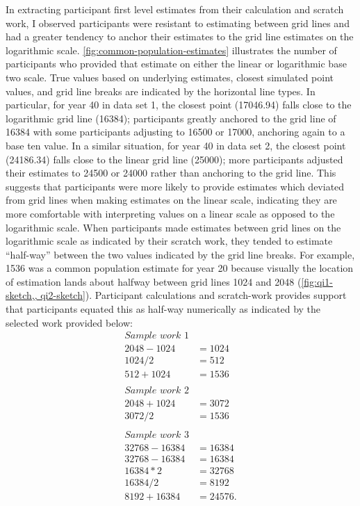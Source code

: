 \documentclass[print]{nuthesis}
\begin{document}
In extracting participant first level estimates from their calculation and scratch work, I observed participants were resistant to estimating between grid lines and had a greater tendency to anchor their estimates to the grid line estimates on the logarithmic scale.
\cref{fig:common-population-estimates} illustrates the number of participants who provided that estimate on either the linear or logarithmic base two scale.
True values based on underlying estimates, closest simulated point values, and grid line breaks are indicated by the horizontal line types.
In particular, for year 40 in data set 1, the closest point (17046.94) falls close to the logarithmic grid line (16384); participants greatly anchored to the grid line of 16384 with some participants adjusting to 16500 or 17000, anchoring again to a base ten value.
In a similar situation, for year 40 in data set 2, the closest point (24186.34) falls close to the linear grid line (25000); more participants adjusted their estimates to 24500 or 24000 rather than anchoring to the grid line.
This suggests that participants were more likely to provide estimates which deviated from grid lines when making estimates on the linear scale, indicating they are more comfortable with interpreting values on a linear scale as opposed to the logarithmic scale.
When participants made estimates between grid lines on the logarithmic scale as indicated by their scratch work, they tended to estimate ``half-way'' between the two values indicated by the grid line breaks.
For example, 1536 was a common population estimate for year 20 because visually the location of estimation lands about halfway between grid lines 1024 and 2048 (\cref{fig:qi1-sketch,, qi2-sketch}).
Participant calculations and scratch-work provides support that participants equated this as half-way numerically as indicated by the selected work provided below:
\begin{align}
\textit{Sample work 1} \nonumber\\
2048-1024 &= 1024 \nonumber \\
1024/2 &= 512 \nonumber\\
512+1024 &= 1536 \nonumber
\nonumber \\ 
\nonumber \\
\textit{Sample work 2} \nonumber\\
2048 + 1024 & =3072 \nonumber\\
3072/2 & =1536 \nonumber
\nonumber \\ 
\nonumber \\
\textit{Sample work 3} \nonumber\\
32768-16384&=16384  \nonumber\\
32768-16384&=16384  \nonumber\\
16384*2&=32768  \nonumber\\
16384/2&=8192  \nonumber\\
8192+16384&=24576.  \nonumber
\end{align}
\end{document}
